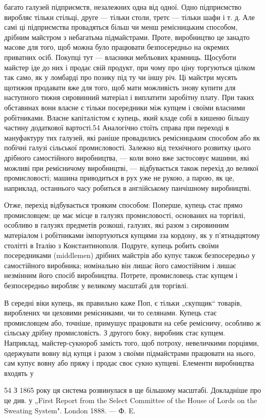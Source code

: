 багато галузей підприємств, незалежних одна від одної. Одно
підприємство виробляє тільки стільці, друге — тільки столи,
третє — тільки шафи і т. д. Але самі ці підприємства провадяться
більш чи менш ремісницьким способом, дрібним майстром з небагатьма
підмайстрами. Проте, виробництво це занадто масове для
того, щоб можна було працювати безпосередньо на окремих
приватних осіб. Покупці тут — власники мебльових крамниць.
Щосуботи майстер іде до них і продає свій продукт, при чому
про ціну торгуються цілком так само, як у ломбарді про позику
під ту чи іншу річ. Ці майстри мусять щотижня продавати вже
для того, щоб мати можливість знову купити для наступного
тижня сировинний матеріал і виплатити заробітну плату. При
таких обставинах вони власне є тільки посередники між купцем
і своїми власними робітниками. Власне капіталістом є купець,
який кладе собі в кишеню більшу частину додаткової вартості.54
Аналогічно стоїть справа при переході в мануфактуру тих галузей,
які раніше провадились ремісницьким способом або як
побічні галузі сільської промисловості. Залежно від технічного
розвитку цього дрібного самостійного виробництва, — коли воно
вже застосовує машини, які можливі при ремісничому виробництві,
— відбувається також перехід до великої промисловості;
машина приводиться в рух уже не рукою, а парою, як це, наприклад,
останнього часу робиться в англійському панчішному
виробництві.

Отже, перехід відбувається трояким способом: Поперше,
купець стає прямо промисловцем; це має місце в галузях промисловості,
основаних на торгівлі, особливо в галузях предметів
розкоші, галузях, які разом з сировинним матеріалом і робітниками
імпортуються купцями зза кордону, як у п’ятнадцятому
столітті в Італію з Константинополя. Подруге, купець робить
своїми посередниками (middlemen) дрібних майстрів або купує
також безпосередньо у самостійного виробника; номінально
він лишає його самостійним і лишає незмінним його спосіб виробництва.
Потрете, промисловець стає купцем і безпосередньо
виробляє у великому масштабі для торгівлі.

В середні віки купець, як правильно каже Поп, є тільки
„скупщик“ товарів, вироблених чи цеховими ремісниками, чи то
селянами. Купець стає промисловцем або, точніше, примушує
працювати на себе ремісничу, особливо ж сільську дрібну промисловість.
З другого боку, виробник стає купцем. Наприклад,
майстер-сукнороб замість того, щоб потроху, невеличкими
порціями, одержувати вовну від купця і разом з своїми підмайстрами
працювати на нього, сам купує вовну або пряжу і
продає своє сукно купцеві. Елементи виробництва входять у

54    З 1865 року ця система розвинулася в ще більшому масштабі. Докладніше
про це див. у „First Report from the Select Committee of the House of Lords on
the Sweating System". London 1888. — Ф. E.
